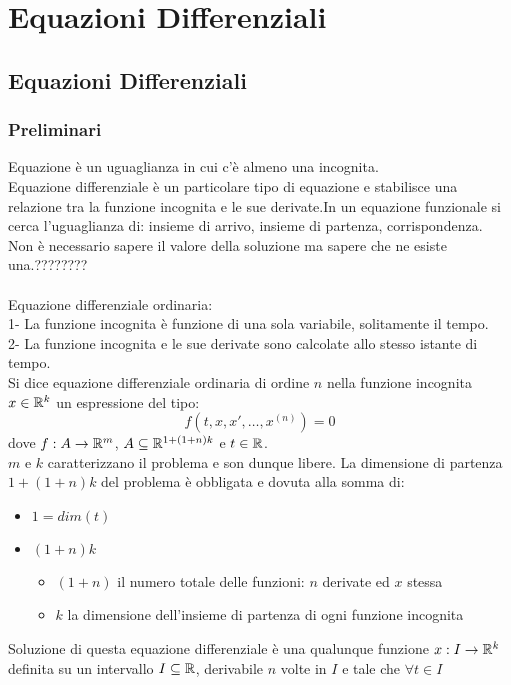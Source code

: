 \part{Equazioni Differenziali}
\chapter{Equazioni Differenziali}
\section{Preliminari}
Equazione è un uguaglianza in cui c'è almeno una incognita.\\
Equazione differenziale è un particolare tipo di equazione e stabilisce una relazione tra la funzione incognita e le sue derivate.In un equazione funzionale si cerca l'uguaglianza di: insieme di arrivo, insieme di partenza, corrispondenza.\\
Non è necessario sapere il valore della soluzione ma sapere che ne esiste una.????????\\\\
Equazione differenziale ordinaria:\\
1- La funzione incognita è funzione di una sola variabile, solitamente il tempo.\\
2- La funzione incognita e le sue derivate sono calcolate allo stesso istante di tempo.\\
\label{def:equaz_diff}
Si dice equazione differenziale ordinaria di ordine $n$ nella funzione incognita $x\in \mathbb{R}^k$ un espressione del tipo:
$$f(t,x, x',\ldots,x^{(n)})=0$$
dove $f:A\to \mathbb{R}^m$, $A\subseteq \mathbb{R}^{1+(1+n)k}$ e $t\in \mathbb{R}$.\\
$m$ e $k$ caratterizzano il problema e son dunque libere. La dimensione di partenza $1+(1+n)k$ del problema è obbligata e dovuta alla somma di:
\begin{itemize}
	\item $1 = dim(t)$
	\item $(1+n)k$
	\begin{itemize}
		\item $(1+n)$ il numero totale delle funzioni: $n$ derivate ed $x$ stessa
		\item $k$ la dimensione dell'insieme di partenza di ogni funzione incognita
	\end{itemize}
\end{itemize}
Soluzione di questa equazione differenziale è una qualunque funzione $x:I\to \mathbb{R}^k$ definita su un intervallo $I\subseteq \mathbb{R}$, derivabile $n$ volte in $I$ e tale che $\forall t\in I$\\
